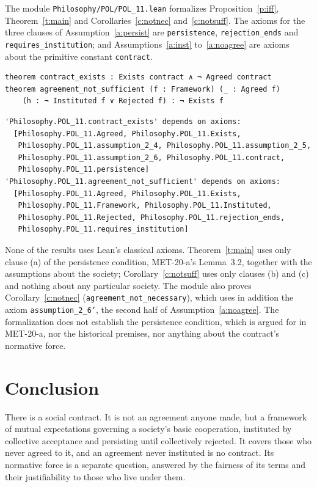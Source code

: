 \documentclass{situationist-preprint}
\begin{document}
{\sloppy The module \nolinkurl{Philosophy/POL/POL_11.lean} formalizes Proposition~\ref{p:iff}, Theorem~\ref{t:main} and Corollaries~\ref{c:notnec} and~\ref{c:notsuff}. The axioms for the three clauses of Assumption~\ref{a:persist} are \texttt{persistence}, \texttt{rejection\_ends} and \texttt{requires\_institution}; and Assumptions~\ref{a:inst} to~\ref{a:noagree} are axioms about the primitive constant \texttt{contract}.\par}

\begin{lstlisting}
theorem contract_exists : Exists contract ∧ ¬ Agreed contract
theorem agreement_not_sufficient (f : Framework) (_ : Agreed f)
    (h : ¬ Instituted f ∨ Rejected f) : ¬ Exists f
\end{lstlisting}

\begin{lstlisting}
'Philosophy.POL_11.contract_exists' depends on axioms:
  [Philosophy.POL_11.Agreed, Philosophy.POL_11.Exists,
   Philosophy.POL_11.assumption_2_4, Philosophy.POL_11.assumption_2_5,
   Philosophy.POL_11.assumption_2_6, Philosophy.POL_11.contract,
   Philosophy.POL_11.persistence]
'Philosophy.POL_11.agreement_not_sufficient' depends on axioms:
  [Philosophy.POL_11.Agreed, Philosophy.POL_11.Exists,
   Philosophy.POL_11.Framework, Philosophy.POL_11.Instituted,
   Philosophy.POL_11.Rejected, Philosophy.POL_11.rejection_ends,
   Philosophy.POL_11.requires_institution]
\end{lstlisting}

None of the results uses Lean's classical axioms. Theorem~\ref{t:main} uses only clause (a) of the persistence condition, MET-20-a's Lemma~3.2, together with the assumptions about the society; Corollary~\ref{c:notsuff} uses only clauses (b) and (c) and nothing about any particular society. The module also proves Corollary~\ref{c:notnec} (\texttt{agreement\_not\_necessary}), which uses in addition the axiom \texttt{assumption\_2\_6'}, the second half of Assumption~\ref{a:noagree}. The formalization does not establish the persistence condition, which is argued for in MET-20-a, nor the historical premises, nor anything about the contract's normative force.

\section{Conclusion}

There is a social contract. It is not an agreement anyone made, but a framework of mutual expectations governing a society's basic cooperation, instituted by collective acceptance and persisting until collectively rejected. It covers those who never agreed to it, and an agreement never instituted is no contract. Its normative force is a separate question, answered by the fairness of its terms and their justifiability to those who live under them.
\end{document}

